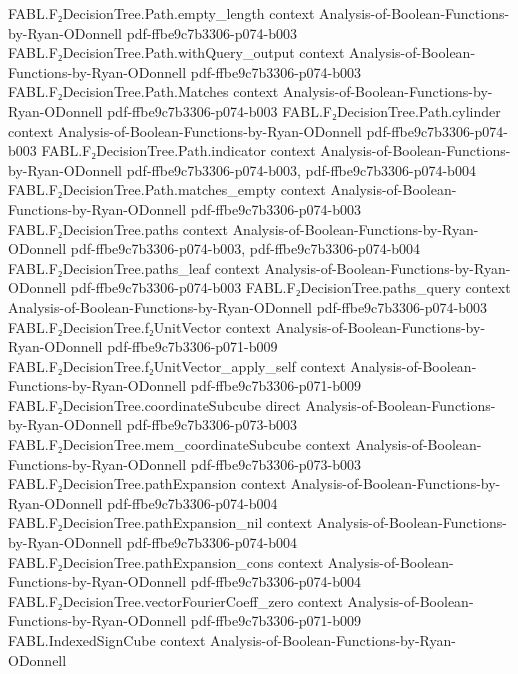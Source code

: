\begin{theorem}
  {FABL.F₂DecisionTree.Path.empty_length}
  {context}
  {Analysis-of-Boolean-Functions-by-Ryan-ODonnell}
  {pdf-ffbe9c7b3306-p074-b003}
\proofstep
  {FABL.F₂DecisionTree.Path.withQuery_output}
  {context}
  {Analysis-of-Boolean-Functions-by-Ryan-ODonnell}
  {pdf-ffbe9c7b3306-p074-b003}
\proofstep
  {FABL.F₂DecisionTree.Path.Matches}
  {context}
  {Analysis-of-Boolean-Functions-by-Ryan-ODonnell}
  {pdf-ffbe9c7b3306-p074-b003}
\proofstep
  {FABL.F₂DecisionTree.Path.cylinder}
  {context}
  {Analysis-of-Boolean-Functions-by-Ryan-ODonnell}
  {pdf-ffbe9c7b3306-p074-b003}
\proofstep
  {FABL.F₂DecisionTree.Path.indicator}
  {context}
  {Analysis-of-Boolean-Functions-by-Ryan-ODonnell}
  {pdf-ffbe9c7b3306-p074-b003,
    pdf-ffbe9c7b3306-p074-b004}
\proofstep
  {FABL.F₂DecisionTree.Path.matches_empty}
  {context}
  {Analysis-of-Boolean-Functions-by-Ryan-ODonnell}
  {pdf-ffbe9c7b3306-p074-b003}
\proofstep
  {FABL.F₂DecisionTree.paths}
  {context}
  {Analysis-of-Boolean-Functions-by-Ryan-ODonnell}
  {pdf-ffbe9c7b3306-p074-b003,
    pdf-ffbe9c7b3306-p074-b004}
\proofstep
  {FABL.F₂DecisionTree.paths_leaf}
  {context}
  {Analysis-of-Boolean-Functions-by-Ryan-ODonnell}
  {pdf-ffbe9c7b3306-p074-b003}
\proofstep
  {FABL.F₂DecisionTree.paths_query}
  {context}
  {Analysis-of-Boolean-Functions-by-Ryan-ODonnell}
  {pdf-ffbe9c7b3306-p074-b003}
\proofstep
  {FABL.F₂DecisionTree.f₂UnitVector}
  {context}
  {Analysis-of-Boolean-Functions-by-Ryan-ODonnell}
  {pdf-ffbe9c7b3306-p071-b009}
\proofstep
  {FABL.F₂DecisionTree.f₂UnitVector_apply_self}
  {context}
  {Analysis-of-Boolean-Functions-by-Ryan-ODonnell}
  {pdf-ffbe9c7b3306-p071-b009}
\proofstep
  {FABL.F₂DecisionTree.coordinateSubcube}
  {direct}
  {Analysis-of-Boolean-Functions-by-Ryan-ODonnell}
  {pdf-ffbe9c7b3306-p073-b003}
\proofstep
  {FABL.F₂DecisionTree.mem_coordinateSubcube}
  {context}
  {Analysis-of-Boolean-Functions-by-Ryan-ODonnell}
  {pdf-ffbe9c7b3306-p073-b003}
\proofstep
  {FABL.F₂DecisionTree.pathExpansion}
  {context}
  {Analysis-of-Boolean-Functions-by-Ryan-ODonnell}
  {pdf-ffbe9c7b3306-p074-b004}
\proofstep
  {FABL.F₂DecisionTree.pathExpansion_nil}
  {context}
  {Analysis-of-Boolean-Functions-by-Ryan-ODonnell}
  {pdf-ffbe9c7b3306-p074-b004}
\proofstep
  {FABL.F₂DecisionTree.pathExpansion_cons}
  {context}
  {Analysis-of-Boolean-Functions-by-Ryan-ODonnell}
  {pdf-ffbe9c7b3306-p074-b004}
\proofstep
  {FABL.F₂DecisionTree.vectorFourierCoeff_zero}
  {context}
  {Analysis-of-Boolean-Functions-by-Ryan-ODonnell}
  {pdf-ffbe9c7b3306-p071-b009}
\proofstep
  {FABL.IndexedSignCube}
  {context}
  {Analysis-of-Boolean-Functions-by-Ryan-ODonnell}

\end{theorem}
